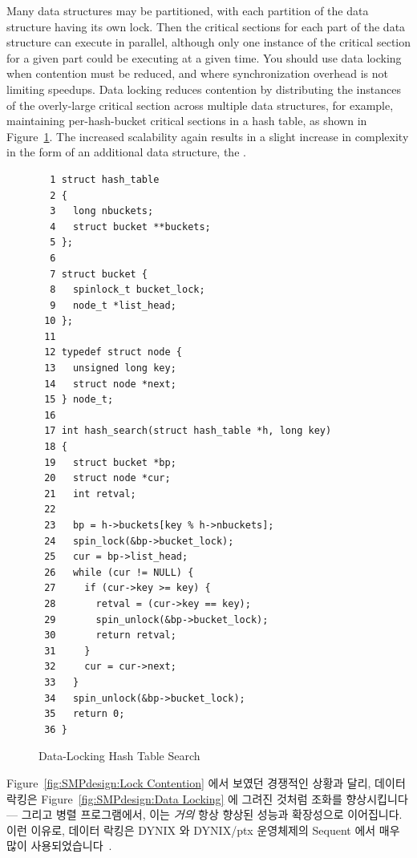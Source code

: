 Many data structures may be partitioned,
with each partition of the data structure having its own lock.
Then the critical sections for each part of the data structure
can execute in parallel,
although only one instance of the critical section for a given
part could be executing at a given time.
You should use data locking when contention must
be reduced, and where synchronization overhead is not
limiting speedups.
Data locking reduces contention by distributing the instances
of the overly-large critical section across multiple data structures,
for example, maintaining per-hash-bucket critical sections in a
hash table, as shown in
Figure~\ref{fig:SMPdesign:Data-Locking Hash Table Search}.
The increased scalability again results in a slight increase in complexity
in the form of an additional data structure, the .
\fi

\begin{figure}[htbp]
{ \scriptsize
\begin{verbatim}
  1 struct hash_table
  2 {
  3   long nbuckets;
  4   struct bucket **buckets;
  5 };
  6
  7 struct bucket {
  8   spinlock_t bucket_lock;
  9   node_t *list_head;
 10 };
 11
 12 typedef struct node {
 13   unsigned long key;
 14   struct node *next;
 15 } node_t;
 16
 17 int hash_search(struct hash_table *h, long key)
 18 {
 19   struct bucket *bp;
 20   struct node *cur;
 21   int retval;
 22
 23   bp = h->buckets[key % h->nbuckets];
 24   spin_lock(&bp->bucket_lock);
 25   cur = bp->list_head;
 26   while (cur != NULL) {
 27     if (cur->key >= key) {
 28       retval = (cur->key == key);
 29       spin_unlock(&bp->bucket_lock);
 30       return retval;
 31     }
 32     cur = cur->next;
 33   }
 34   spin_unlock(&bp->bucket_lock);
 35   return 0;
 36 }
\end{verbatim}
}
\caption{Data-Locking Hash Table Search}
\label{fig:SMPdesign:Data-Locking Hash Table Search}
\end{figure}

Figure~\ref{fig:SMPdesign:Lock Contention} 에서 보였던 경쟁적인 상황과 달리,
데이터 락킹은 Figure~\ref{fig:SMPdesign:Data Locking} 에 그려진 것처럼 조화를
향상시킵니다 --- 그리고 병렬 프로그램에서, 이는 \emph{거의} 항상 향상된 성능과
확장성으로 이어집니다.
이런 이유로, 데이터 락킹은 DYNIX 와 DYNIX/ptx 운영체제의 Sequent 에서 매우 많이
사용되었습니다~\cite{Beck85,Inman85,Garg90,Dove90,McKenney92b,McKenney92a,McKenney93}.

